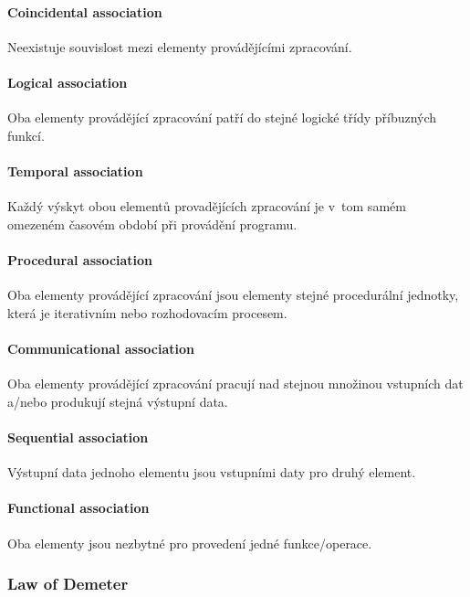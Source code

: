 \paragraph{Coincidental association} Neexistuje souvislost mezi elementy provádějícími zpracování.

\paragraph{Logical association} Oba elementy provádějící zpracování patří do stejné logické třídy příbuzných funkcí.

\paragraph{Temporal association} Každý výskyt obou elementů provadějících zpracování je v~tom samém omezeném časovém období při provádění programu.

\paragraph{Procedural association} Oba elementy provádějící zpracování jsou elementy stejné procedurální jednotky, která je iterativním nebo rozhodovacím procesem.

\paragraph{Communicational association} Oba elementy provádějící zpracování pracují nad stejnou množinou vstupních dat a/nebo produkují stejná výstupní data.

\paragraph{Sequential association} Výstupní data jednoho elementu jsou vstupními daty pro druhý element.

\paragraph{Functional association} Oba elementy jsou nezbytné pro provedení jedné funkce/operace.

\subsubsection{Law of Demeter}


